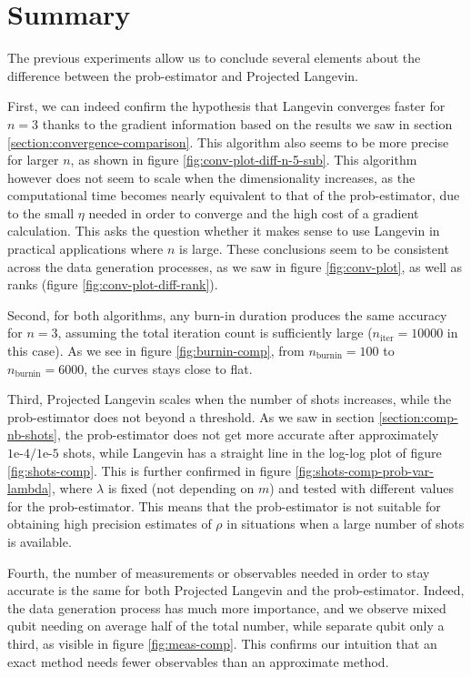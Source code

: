 \documentclass[12pt]{memoir}
\newcommand{\nitern}[1]{$n_{\text{iter}}=#1$}
\newcommand{\nburninn}[1]{$n_{\text{burnin}}=#1$}
\begin{document}
\section{Summary}

The previous experiments allow us to conclude several elements about the difference between the prob-estimator and Projected Langevin. \medbreak


First, we can indeed confirm the hypothesis that Langevin converges faster for $n=3$ thanks to the gradient information based on the results we saw in section \ref{section:convergence-comparison}. This algorithm also seems to be more precise for larger $n$, as shown in figure \ref{fig:conv-plot-diff-n-5-sub}. This algorithm however does not seem to scale when the dimensionality increases, as the computational time becomes nearly equivalent to that of the prob-estimator, due to the small $\eta$ needed in order to converge and the high cost of a gradient calculation. This asks the question whether it makes sense to use Langevin in practical applications where $n$ is large. These conclusions seem to be consistent across the data generation processes, as we saw in figure \ref{fig:conv-plot}, as well as ranks (figure \ref{fig:conv-plot-diff-rank}).\medbreak


Second, for both algorithms, any burn-in duration produces the same accuracy for $n=3$, assuming the total iteration count is sufficiently large (\nitern{10000} in this case). As we see in figure \ref{fig:burnin-comp}, from \nburninn{100} to \nburninn{6000}, the curves stays close to flat.\medbreak


Third, Projected Langevin scales when the number of shots increases, while the prob-estimator does not beyond a threshold. As we saw in section \ref{section:comp-nb-shots}, the prob-estimator does not get more accurate after approximately $1\text{e-}4/1\text{e-}5$ shots, while Langevin has a straight line in the log-log plot of figure \ref{fig:shots-comp}. This is further confirmed in figure \ref{fig:shots-comp-prob-var-lambda}, where $\lambda$ is fixed (not depending on $m$) and tested with different values for the prob-estimator. This means that the prob-estimator is not suitable for obtaining high precision estimates of $\rho$ in situations when a large number of shots is available.\medbreak


Fourth, the number of measurements or observables needed in order to stay accurate is the same for both Projected Langevin and the prob-estimator. Indeed, the data generation process has much more importance, and we observe mixed qubit needing on average half of the total number, while separate qubit only a third, as visible in figure \ref{fig:meas-comp}. This confirms our intuition that an exact method needs fewer observables than an approximate method.\medbreak
\end{document}
